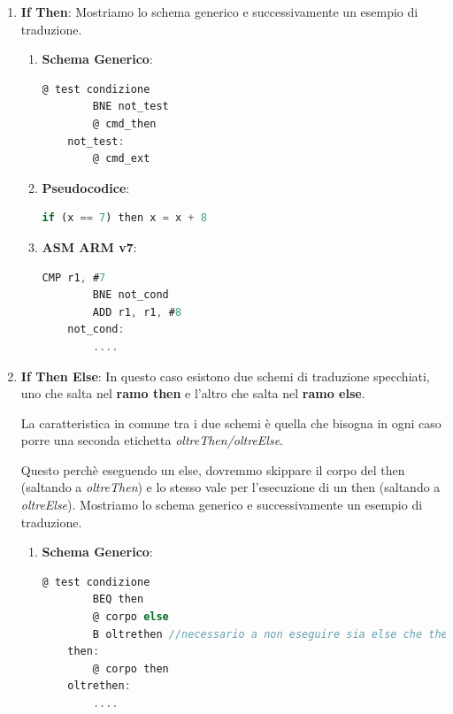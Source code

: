 \documentclass{article}
\begin{document}
\begin{enumerate}
    \item \textbf{If Then}: Mostriamo lo schema generico e successivamente un esempio di traduzione.
    \begin{enumerate}
        \item \textbf{Schema Generico}: 
\begin{lstlisting}[language = JavaScript]
        @ test condizione
        BNE not_test
        @ cmd_then
    not_test:
        @ cmd_ext
\end{lstlisting}
        \item \textbf{Pseudocodice}: 
\begin{lstlisting}[language = JavaScript]
    if (x == 7) then x = x + 8
\end{lstlisting}

        \item \textbf{ASM ARM v7}: 
\begin{lstlisting}[language = JavaScript]
        CMP r1, #7
        BNE not_cond
        ADD r1, r1, #8
    not_cond:
        ....
\end{lstlisting}
    \end{enumerate}

    \item \textbf{If Then Else}: In questo caso esistono due schemi di traduzione specchiati, uno che salta nel \textbf{ramo then} e l'altro che salta nel \textbf{ramo else}.
    
    La caratteristica in comune tra i due schemi è quella che bisogna in ogni caso porre una seconda etichetta \textit{oltreThen/oltreElse}. 
    
    Questo perchè eseguendo un else, dovremmo skippare il corpo del then (saltando a \textit{oltreThen}) e lo stesso vale per l'esecuzione di un then (saltando a \textit{oltreElse}).
    Mostriamo lo schema generico e successivamente un esempio di traduzione.

    \vspace*{20px}
    
    \begin{enumerate}
        \item \textbf{Schema Generico}: 
\begin{lstlisting}[language = JavaScript]
        @ test condizione
        BEQ then
        @ corpo else
        B oltrethen //necessario a non eseguire sia else che then
    then:
        @ corpo then
    oltrethen:
        ....
\end{lstlisting}


\end{enumerate}
\end{enumerate}
\end{document}
